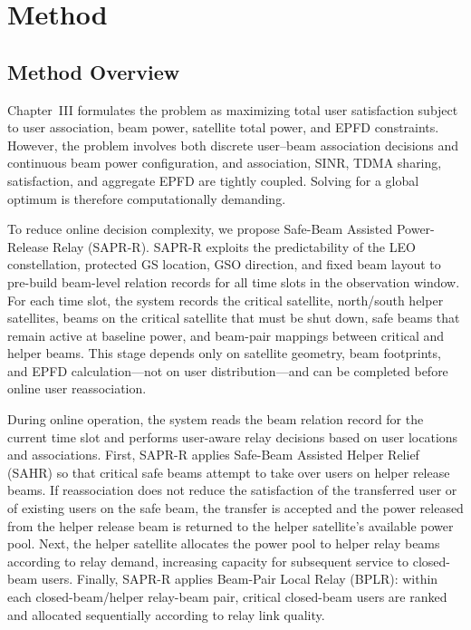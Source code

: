 

\section{Method}
\label{sec:chapter4_en}

\subsection{Method Overview}

Chapter~III formulates the problem as maximizing total user satisfaction subject to user association, beam power, satellite total power, and EPFD constraints. However, the problem involves both discrete user--beam association decisions and continuous beam power configuration, and association, SINR, TDMA sharing, satisfaction, and aggregate EPFD are tightly coupled. Solving for a global optimum is therefore computationally demanding.

To reduce online decision complexity, we propose Safe-Beam Assisted Power-Release Relay (SAPR-R). SAPR-R exploits the predictability of the LEO constellation, protected GS location, GSO direction, and fixed beam layout to pre-build beam-level relation records for all time slots in the observation window. For each time slot, the system records the critical satellite, north/south helper satellites, beams on the critical satellite that must be shut down, safe beams that remain active at baseline power, and beam-pair mappings between critical and helper beams. This stage depends only on satellite geometry, beam footprints, and EPFD calculation—not on user distribution—and can be completed before online user reassociation.

During online operation, the system reads the beam relation record for the current time slot and performs user-aware relay decisions based on user locations and associations. First, SAPR-R applies Safe-Beam Assisted Helper Relief (SAHR) so that critical safe beams attempt to take over users on helper release beams. If reassociation does not reduce the satisfaction of the transferred user or of existing users on the safe beam, the transfer is accepted and the power released from the helper release beam is returned to the helper satellite's available power pool. Next, the helper satellite allocates the power pool to helper relay beams according to relay demand, increasing capacity for subsequent service to closed-beam users. Finally, SAPR-R applies Beam-Pair Local Relay (BPLR): within each closed-beam/helper relay-beam pair, critical closed-beam users are ranked and allocated sequentially according to relay link quality.

